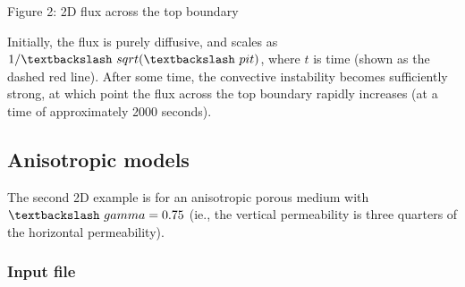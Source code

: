 \documentclass[12pt]{article}
\begin{document}
\par
Figure 2: 2D flux across the top boundary
\par
Initially, the flux is purely diffusive, and scales as$1 / \textbackslash~sqrt(\textbackslash~pi t)$, where $t$ is time (shown as the dashed red line).
After some time, the convective instability becomes sufficiently strong,
at which point the flux across the top boundary rapidly increases (at a
time of approximately 2000 seconds).\subsection{Anisotropic models\label{anisotropic-models}}
\par
The second 2D example is for an anisotropic porous medium with$\textbackslash~gamma = 0.75$ (ie., the vertical permeability is three quarters of the horizontal
permeability).\subsubsection{Input file\label{input-file\_1}}
\par
\end{document}
